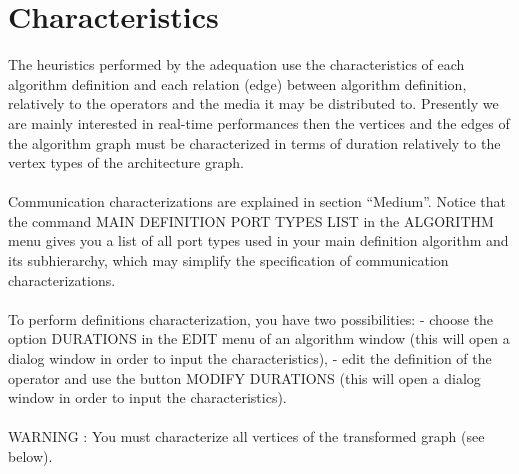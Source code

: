 \documentclass[11pt,twoside]{report}
\begin{document}
\chapter{Characteristics}
\label{characteristics}
The heuristics performed by the adequation use the characteristics of
each algorithm definition and each relation (edge) between algorithm
definition, relatively to the operators and the media it may be
distributed to. Presently we are mainly interested in real-time
performances then the vertices and the edges of the algorithm graph
must be characterized in terms of
duration relatively to the vertex types of the architecture graph.\\\\
Communication characterizations are explained in section ``Medium''.
Notice that the command MAIN DEFINITION PORT TYPES LIST in the
ALGORITHM menu gives you a list of all port types used in your main
definition algorithm and its subhierarchy, which may
simplify the specification of communication characterizations.\\\\
To perform definitions characterization, you have two possibilities: -
choose the option DURATIONS in the EDIT menu of an algorithm window
(this will open a dialog window in order to input the
characteristics), - edit the definition of the operator and use the
button MODIFY DURATIONS (this will open a dialog window in order to
input the
characteristics).\\\\
WARNING : You must characterize all vertices of the transformed graph
(see below).
\end{document}
